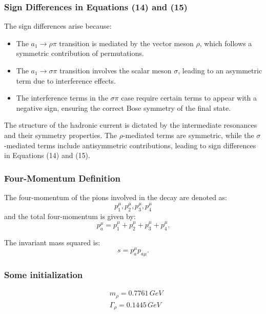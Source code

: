 \documentclass[12pt]{article}
\begin{document}
\subsubsection*{Sign Differences in Equations (14) and (15)}
The sign differences arise because:
\begin{itemize}
\item The $a_1 \to \rho\pi$ transition is mediated by the vector meson $\rho$, which follows a symmetric contribution of permutations.
\item The $a_1 \to \sigma\pi$ transition involves the scalar meson $\sigma$, leading to an asymmetric term due to interference effects.
\item The interference terms in the $\sigma\pi$ case require certain terms to appear with a negative sign, ensuring the correct Bose symmetry of the final state.
\end{itemize}

The structure of the hadronic current is dictated by the intermediate resonances and their symmetry properties. The $\rho$-mediated terms are symmetric, while the $\sigma$-mediated terms include antisymmetric contributions, leading to sign differences in Equations (14) and (15).




\subsubsection{Four-Momentum Definition}
The four-momentum of the pions involved in the decay are denoted as:
\begin{equation}
p_1^\mu, p_2^\mu, p_3^\mu, p_4^\mu
\end{equation}
and the total four-momentum is given by:
\begin{equation}
p_a^\mu = p_1^\mu + p_2^\mu + p_3^\mu + p_4^\mu.
\end{equation}

The invariant mass squared is:
\begin{equation}
s = p_a^\mu p_{a\mu}.
\end{equation}



\subsubsection{Some initialization}

\begin{align*}
&m_\rho = 0.7761\,GeV\\
&\Gamma_\rho = 0.1445\,GeV
\end{align*}
\end{document}

